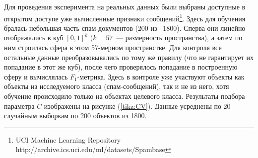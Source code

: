 Для проведения эксперимента на реальных данных были выбраны доступные в открытом доступе уже вычисленные признаки сообщений\footnote{UCI Machine Learning Repository \textsf{http://archive.ics.uci.edu/ml/datasets/Spambase}}.
Здесь для обучения бралась небольшая часть спам-документов (200 из ~1800).
Сперва они линейно отображались в куб $[0, 1]^k$ ($k = 57$~--- размерность пространства), а затем по ним строилась сфера в этом 57-мерном пространстве.
Для контроля все остальные данные преобразовывались по тому же правилу (что не гарантирует их попадание в этот же куб), после чего проверялось попадание в построенную сферу и вычислялась $F_1$-метрика.
Здесь в контроле уже участвуют объекты как объекты из исследуемого класса (спам-сообщений), так и не из него, хотя обучение происходило только на объектах целевого класса.
Результаты подбора параметра $C$ изображены на рисунке (\ref{tikz:CV}). Данные усреднены по 20 случайным выборкам по 200 объектов из 1800.

